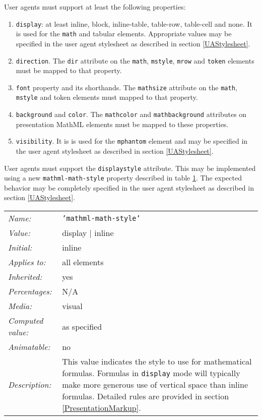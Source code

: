 User agents must support at least the following properties:
\begin{enumerate}
\item {\tt display}: at least inline, block, inline-table, table-row,
  table-cell and none. It is used for the {\tt math} and tabular
  elements. Appropriate values may be specified in the user agent stylesheet
  as described in section \ref{UAStylesheet}.
\item {\tt direction}. The {\tt dir} attribute on the {\tt math}, {\tt mstyle},
  {\tt mrow} and {\tt token} elements must be mapped to that property.
\item {\tt font} property and its shorthands. The {\tt mathsize} attribute on
  the {\tt math}, {\tt mstyle} and token elements must mapped to that property.
\item {\tt background} and {\tt color}. The {\tt mathcolor} and
  {\tt mathbackground} attributes on presentation MathML elements must be
  mapped to these properties.
\item {\tt visibility}. It is is used for the {\tt mphantom} element and may be
  specified in the user agent stylesheet as described in section
  \ref{UAStylesheet}.
\end{enumerate}

User agents must support the {\tt displaystyle} attribute. This may be
implemented using a new {\tt mathml-math-style} property described in
table \ref{tab:CSSMathStyle}. The expected behavior may be completely
specified in the user agent stylesheet as described in section
\ref{UAStylesheet}.

\begin{table}
\begin{tabular}{ll}
  \emph{Name:} & {\tt 'mathml-math-style'} \\
  \emph{Value:} & display | inline \\
  \emph{Initial:} & inline \\
  \emph{Applies to:} & all elements \\
  \emph{Inherited:} & yes \\
  \emph{Percentages:} & N/A \\
  \emph{Media:} & visual \\
  \emph{Computed value:} & as specified \\
  \emph{Animatable:} & no \\
  \emph{Description:} & This value indicates the style to use for mathematical
  formulas. Formulas in {\tt display} mode will typically make more generous
  use of vertical space than inline formulas. Detailed rules are provided in
  section \ref{PresentationMarkup}.
\end{tabular}
\label{tab:CSSMathStyle}
\end{table}

